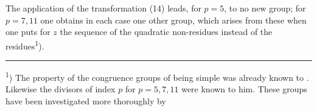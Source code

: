 The application of the transformation (14) leads, for $p = 5$, to no new group; for $p = 7, 11$ one obtains in each case one other group, which arises from these when one puts for $z$ the sequence of the quadratic non-residues instead of the residues\textsuperscript{1}).

\bigskip
\hrule
\bigskip

\textsuperscript{1}) The property of the congruence groups of being simple was already known to . Likewise the divisors of index $p$ for $p = 5, 7, 11$ were known to him. These groups have been investigated more thoroughly by
